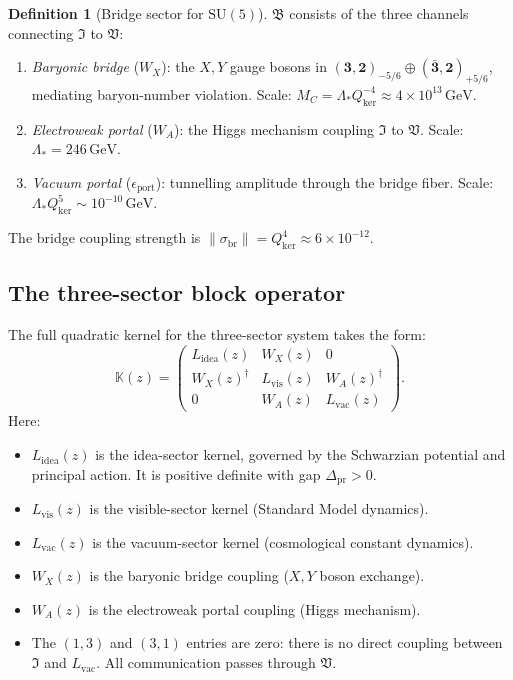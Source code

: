 \documentclass[12pt]{article}
\theoremstyle{plain}
\theoremstyle{definition}
\newtheorem{definition}[theorem]{Definition}
\numberwithin{equation}{section}
\newcommand{\fI}{\mathfrak{I}}
\newcommand{\fV}{\mathfrak{V}}
\newcommand{\fB}{\mathfrak{B}}
\newcommand{\pr}{\mathrm{pr}}
\newcommand{\vis}{\mathrm{vis}}
\newcommand{\idea}{\mathrm{idea}}
\newcommand{\br}{\mathrm{br}}
\newcommand{\kker}{\mathrm{ker}}
\begin{document}
\begin{definition}[Bridge sector for $\mathrm{SU}(5)$]
$\fB$ consists of the three channels connecting $\fI$ to $\fV$:
\begin{enumerate}[label=(\roman*)]
\item \emph{Baryonic bridge} ($W_X$): the $X,Y$ gauge bosons in $(\mathbf{3},\mathbf{2})_{-5/6}\oplus(\bar{\mathbf{3}},\mathbf{2})_{+5/6}$, mediating baryon-number violation.  Scale: $M_C=\Lambda_* Q_{\kker}^{-4}\approx 4\times10^{13}\,\mathrm{GeV}$.
\item \emph{Electroweak portal} ($W_A$): the Higgs mechanism coupling $\fI$ to $\fV$.  Scale: $\Lambda_*=246\,\mathrm{GeV}$.
\item \emph{Vacuum portal} ($\epsilon_{\mathrm{port}}$): tunnelling amplitude through the bridge fiber.  Scale: $\Lambda_* Q_{\kker}^5\sim 10^{-10}\,\mathrm{GeV}$.
\end{enumerate}
The bridge coupling strength is $\|\sigma_{\br}\|=Q_{\kker}^4\approx 6\times10^{-12}$.
\end{definition}

\subsection{The three-sector block operator}

The full quadratic kernel for the three-sector system takes the form:
\begin{equation}
\mathbb{K}(z) = \begin{pmatrix}
L_{\idea}(z) & W_X(z) & 0\\
W_X(z)^\dagger & L_{\vis}(z) & W_A(z)^\dagger\\
0 & W_A(z) & L_{\mathrm{vac}}(z)
\end{pmatrix}.
\end{equation}
Here:
\begin{itemize}
\item $L_{\idea}(z)$ is the idea-sector kernel, governed by the Schwarzian potential and principal action.  It is positive definite with gap $\Delta_{\pr}>0$.
\item $L_{\vis}(z)$ is the visible-sector kernel (Standard Model dynamics).
\item $L_{\mathrm{vac}}(z)$ is the vacuum-sector kernel (cosmological constant dynamics).
\item $W_X(z)$ is the baryonic bridge coupling ($X,Y$ boson exchange).
\item $W_A(z)$ is the electroweak portal coupling (Higgs mechanism).
\item The $(1,3)$ and $(3,1)$ entries are zero: there is no direct coupling between $\fI$ and $L_{\mathrm{vac}}$.  All communication passes through $\fV$.
\end{itemize}
\end{document}
